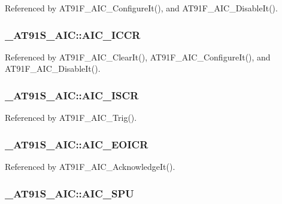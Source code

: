 Referenced by AT91F\_\-AIC\_\-ConfigureIt(), and AT91F\_\-AIC\_\-DisableIt().\hypertarget{struct__AT91S__AIC_8e7dbf14bb5c166df24bb1d014f1a5d0}{
\subsubsection{ {\bf \_\-AT91S\_\-AIC::AIC\_\-ICCR}}}
\label{struct__AT91S__AIC_8e7dbf14bb5c166df24bb1d014f1a5d0}




Referenced by AT91F\_\-AIC\_\-ClearIt(), AT91F\_\-AIC\_\-ConfigureIt(), and AT91F\_\-AIC\_\-DisableIt().\hypertarget{struct__AT91S__AIC_2784932bec9494dde08e3d63e821da50}{
\subsubsection{ {\bf \_\-AT91S\_\-AIC::AIC\_\-ISCR}}}
\label{struct__AT91S__AIC_2784932bec9494dde08e3d63e821da50}




Referenced by AT91F\_\-AIC\_\-Trig().\hypertarget{struct__AT91S__AIC_dbed024b2ed1aa309d77ed69db0cbcc9}{
\subsubsection{ {\bf \_\-AT91S\_\-AIC::AIC\_\-EOICR}}}
\label{struct__AT91S__AIC_dbed024b2ed1aa309d77ed69db0cbcc9}




Referenced by AT91F\_\-AIC\_\-AcknowledgeIt().\hypertarget{struct__AT91S__AIC_0e99c4c50663bf1ea7142e40d8e911e2}{
\subsubsection{ {\bf \_\-AT91S\_\-AIC::AIC\_\-SPU}}}
\label{struct__AT91S__AIC_0e99c4c50663bf1ea7142e40d8e911e2}




